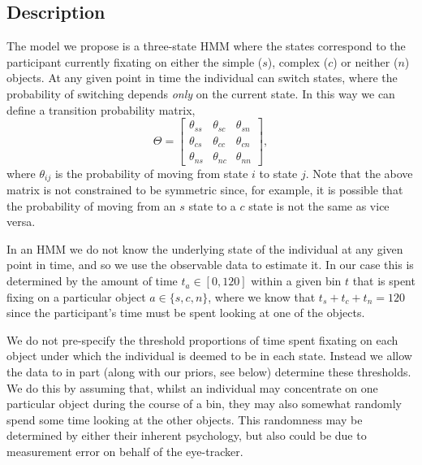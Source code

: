 \documentclass[9pt]{article}
\begin{document}
\subsection{Description}
The model we propose is a three-state HMM where the states correspond to the participant currently fixating on either the simple ($s$), complex ($c$) or neither ($n$) objects. At any given point in time the individual can switch states, where the probability of switching depends \textit{only} on the current state. In this way we can define a transition probability matrix,
%
\[
\Theta = 
\begin{bmatrix}
\theta_{ss} & \theta_{sc} & \theta_{sn}\\
\theta_{cs} & \theta_{cc} & \theta_{cn}\\
\theta_{ns} & \theta_{nc} & \theta_{nn}
\end{bmatrix},
\]
%
where $\theta_{ij}$ is the probability of moving from state $i$ to state $j$. Note that the above matrix is not constrained to be symmetric since, for example, it is possible that the probability of moving from an $s$ state to a $c$ state is not the same as vice versa.

In an HMM we do not know the underlying state of the individual at any given point in time, and so we use the observable data to estimate it. In our case this is determined by the amount of time $t_a\in[0,120]$ within a given bin $t$ that is spent fixing on a particular object $a\in\{s,c,n\}$, where we know that $t_s + t_c + t_n = 120$ since the participant's time must be spent looking at one of the objects.

We do not pre-specify the threshold proportions of time spent fixating on each object under which the individual is deemed to be in each state. Instead we allow the data to in part (along with our priors, see below) determine these thresholds. We do this by assuming that, whilst an individual may concentrate on one particular object during the course of a bin, they may also somewhat randomly spend some time looking at the other objects. This randomness may be determined by either their inherent psychology, but also could be due to measurement error on behalf of the eye-tracker. 
\end{document}
